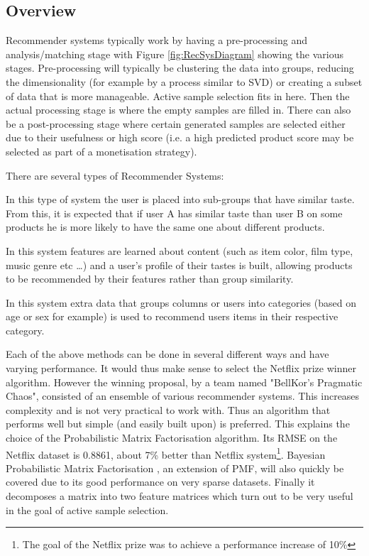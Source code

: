 \subsection{Overview}
Recommender systems typically work by having a pre-processing and analysis/matching stage with Figure \ref*{fig:RecSysDiagram} showing the various stages. Pre-processing will typically be clustering the data into groups, reducing the dimensionality (for example by a process similar to SVD) or creating a subset of data that is more manageable. Active sample selection fits in here. Then the actual processing stage is where the empty samples are filled in. There can also be a post-processing stage where certain generated samples are selected either due to their usefulness or high score (i.e. a high predicted product score may be selected as part of a monetisation strategy). 


There are several types of Recommender Systems:
\begin{description}[style=standard,leftmargin=.5cm,font=\bfseries]
\item[Collaborative Filtering] In this type of system the user is placed into sub-groups that have similar taste. From this, it is expected that if user A has similar taste than user B on some products he is more likely to have the same one about different products.
\item[Content-based filtering] In this system features are learned about content (such as item color, film type, music genre etc \ldots) and a user's profile of their tastes is built, allowing products to be recommended by their features rather than group similarity.
\item[Demographic Based] In this system extra data that groups columns or users into categories (based on age or sex for example) is used to recommend users items in their respective category.
\end{description}

Each of the above methods can be done in several different ways and have varying performance. It would thus make sense to select the Netflix prize winner algorithm. However the winning proposal, by a team named "BellKor's Pragmatic Chaos", consisted of an ensemble of various recommender systems. This increases complexity and is not very practical to work with. Thus an algorithm that performs well but simple (and easily built upon) is preferred. This explains the choice of the Probabilistic Matrix Factorisation algorithm. Its RMSE on the Netflix dataset is 0.8861, about 7\% better than Netflix system\footnote{The goal of the Netflix prize was to achieve a performance increase of 10\%}. Bayesian Probabilistic Matrix Factorisation \cite{SalMnih2008}, an extension of PMF, will also quickly be covered due to its good performance on very sparse datasets. Finally it decomposes a matrix into two feature matrices which turn out to be very useful in the goal of active sample selection.


